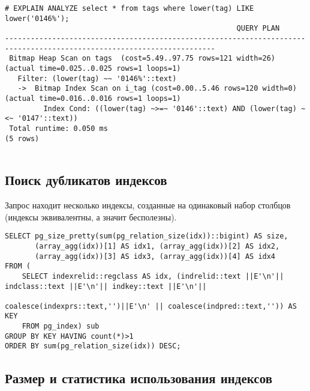 \begin{lstlisting}[label=lst:snippets14,title=snippets/speed\_like.sql]
# EXPLAIN ANALYZE select * from tags where lower(tag) LIKE lower('0146%');
                                                      QUERY PLAN                                                       
-----------------------------------------------------------------------------------------------------------------------
 Bitmap Heap Scan on tags  (cost=5.49..97.75 rows=121 width=26) (actual time=0.025..0.025 rows=1 loops=1)
   Filter: (lower(tag) ~~ '0146%'::text)
   ->  Bitmap Index Scan on i_tag (cost=0.00..5.46 rows=120 width=0) (actual time=0.016..0.016 rows=1 loops=1)
         Index Cond: ((lower(tag) ~>=~ '0146'::text) AND (lower(tag) ~<~ '0147'::text))
 Total runtime: 0.050 ms
(5 rows)


\end{lstlisting}

\subsection{Поиск дубликатов индексов}
Запрос находит несколько индексы, созданные на одинаковый набор столбцов (индексы эквивалентны, а значит бесполезны).

\begin{lstlisting}[label=lst:snippets15,title=snippets/duplicate\_indexes.sql]
SELECT pg_size_pretty(sum(pg_relation_size(idx))::bigint) AS size,
       (array_agg(idx))[1] AS idx1, (array_agg(idx))[2] AS idx2,
       (array_agg(idx))[3] AS idx3, (array_agg(idx))[4] AS idx4
FROM (
    SELECT indexrelid::regclass AS idx, (indrelid::text ||E'\n'|| indclass::text ||E'\n'|| indkey::text ||E'\n'||
                                         coalesce(indexprs::text,'')||E'\n' || coalesce(indpred::text,'')) AS KEY
    FROM pg_index) sub
GROUP BY KEY HAVING count(*)>1
ORDER BY sum(pg_relation_size(idx)) DESC;
\end{lstlisting}

\subsection{Размер и статистика использования индексов}

